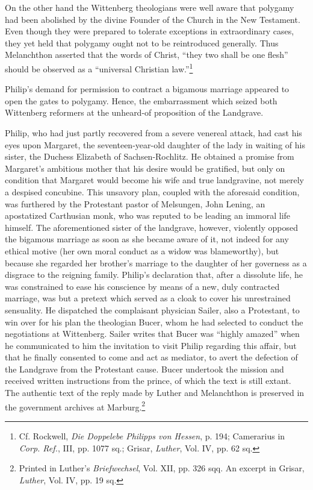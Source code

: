 On the other hand the Wittenberg theologians were well aware
that polygamy had been abolished by the divine Founder of the
Church in the New Testament. Even though they were prepared to
tolerate exceptions in extraordinary cases, they yet held that polygamy
ought not to be reintroduced generally. Thus Melanchthon asserted
that the words of Christ, “they two shall be one flesh” should
be observed as a “universal Christian law.”\footnote
{Cf. Rockwell, \textit{Die Doppelebe Philipps von Hessen}, p. 194; Camerarius in \textit{Corp. Ref.},
III, pp. 1077 sq.; Grisar, \textit{Luther}, Vol. IV, pp. 62 sq.}

Philip’s demand for permission to contract a bigamous marriage
appeared to open the gates to polygamy. Hence, the embarrassment
which seized both Wittenberg reformers at the unheard-of proposition of
the Landgrave.

Philip, who had just partly recovered from a severe venereal attack, had
cast his eyes upon Margaret, the seventeen-year-old
daughter of the lady in waiting of his sister, the Duchess Elizabeth
of Sachsen-Rochlitz. He obtained a promise from Margaret’s ambitious mother
that his desire would be gratified, but only on condition
that Margaret would become his wife and true landgravine, not
merely a despised concubine. This unsavory plan, coupled with the
aforesaid condition, was furthered by the Protestant pastor of Melsungen,
John Lening, an apostatized Carthusian monk, who was
reputed to be leading an immoral life himself. The aforementioned
sister of the landgrave, however, violently opposed the bigamous
marriage as soon as she became aware of it, not indeed for any ethical
motive (her own moral conduct as a widow was blameworthy), but
because she regarded her brother’s marriage to the daughter of her
governess as a disgrace to the reigning family. Philip’s declaration
that, after a dissolute life, he was constrained to ease his conscience by
means of a new, duly contracted marriage, was but a pretext which
served as a cloak to cover his unrestrained sensuality. He dispatched
the complaisant physician Sailer, also a Protestant, to win over for
his plan the theologian Bucer, whom he had selected to conduct the
negotiations at Wittenberg. Sailer writes that Bucer was “highly
amazed” when he communicated to him the invitation to visit Philip
regarding this affair, but that he finally consented to come and act
as mediator, to avert the defection of the Landgrave from the Protestant
cause. Bucer undertook the mission and received written instructions
from the prince, of which the text is still extant. The authentic
text of the reply made by Luther and Melanchthon is preserved in
the government archives at Marburg.\footnote
{Printed in Luther’s \textit{Briefwechsel}, Vol. XII, pp. 326 sqq. An excerpt in Grisar, \textit{Luther},
Vol. IV, pp. 19 sq.}

